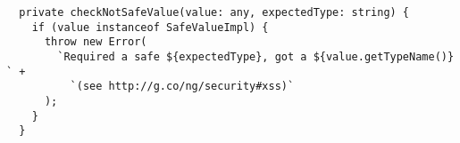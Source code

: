 \begin{verbatim}
  private checkNotSafeValue(value: any, expectedType: string) {
    if (value instanceof SafeValueImpl) {
      throw new Error(
        `Required a safe ${expectedType}, got a ${value.getTypeName()} ` +
          `(see http://g.co/ng/security#xss)`
      );
    }
  }
\end{verbatim}
